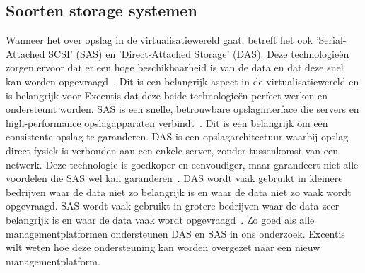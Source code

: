 \subsection{Soorten storage systemen}
Wanneer het over opslag in de virtualisatiewereld gaat, betreft het ook 'Serial-Attached SCSI' (SAS) en 'Direct-Attached Storage' (DAS). Deze technologieën zorgen ervoor dat er een hoge beschikbaarheid is van de data en dat deze snel kan worden opgevraagd~\autocite{griswold2002storage}. Dit is een belangrijk aspect in de virtualisatiewereld en is belangrijk voor Excentis dat deze beide technologieën perfect werken en ondersteunt worden.
SAS is een snelle, betrouwbare opslaginterface die servers en high-performance opslagapparaten verbindt~\autocite{aravindan2014performance}. Dit is een belangrijk om een consistente opslag te garanderen. DAS is een opslagarchitectuur waarbij opslag direct fysiek is verbonden aan een enkele server, zonder tussenkomst van een netwerk. Deze technologie is goedkoper en eenvoudiger, maar garandeert niet alle voordelen die SAS wel kan garanderen~\autocite{griswold2002storage}.
DAS wordt vaak gebruikt in kleinere bedrijven waar de data niet zo belangrijk is en waar de data niet zo vaak wordt opgevraagd. SAS wordt vaak gebruikt in grotere bedrijven waar de data zeer belangrijk is en waar de data vaak wordt opgevraagd~\autocite{griswold2002storage}.
Zo goed als alle managementplatformen ondersteunen DAS en SAS in ons onderzoek. Excentis wilt weten hoe deze ondersteuning kan worden overgezet naar een nieuw managementplatform.

